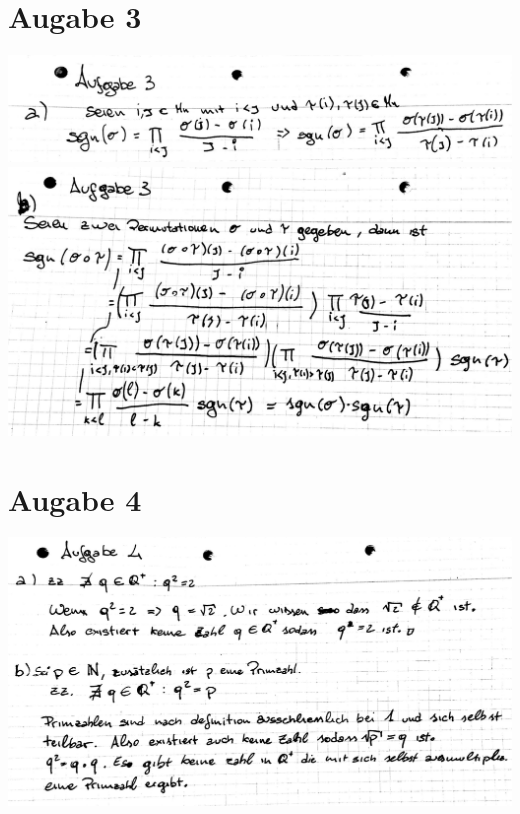 \documentclass[14pt,a4paper,landscape]{article}
\begin{document}
\section*{Augabe 3}
\includegraphics[scale=0.3]{AB1-3_2.jpg} 
\newpage
\includegraphics[scale=0.3]{AB1-3_1.jpg} 

\newpage
\section*{Augabe 4}
\includegraphics[scale=0.3]{AB1-4_1.jpg} 
\end{document}
